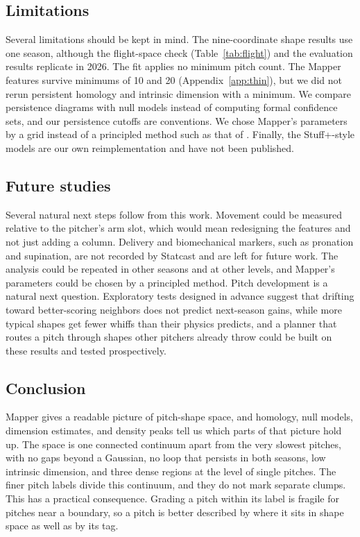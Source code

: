 \documentclass{article}
\theoremstyle{definition}
\theoremstyle{remark}
\begin{document}
\subsection{Limitations}\label{sec:limits}
Several limitations should be kept in mind.
The nine-coordinate shape results use one season, although the flight-space check (Table~\ref{tab:flight}) and the evaluation results replicate in 2026.
The fit applies no minimum pitch count. The Mapper features survive minimums of 10 and 20 (Appendix~\ref{app:thin}), but we did not rerun persistent homology and intrinsic dimension with a minimum.
We compare persistence diagrams with null models instead of computing formal confidence sets, and our persistence cutoffs are conventions.
We chose Mapper's parameters by a grid instead of a principled method such as that of \textcite{carrieremicheloudot2018}.
Finally, the Stuff+-style models are our own reimplementation and have not been published.

\subsection{Future studies}
Several natural next steps follow from this work.
Movement could be measured relative to the pitcher's arm slot, which would mean redesigning the features and not just adding a column.
Delivery and biomechanical markers, such as pronation and supination, are not recorded by Statcast and are left for future work.
The analysis could be repeated in other seasons and at other levels, and Mapper's parameters could be chosen by a principled method.
Pitch development is a natural next question. Exploratory tests designed in advance suggest that drifting toward better-scoring neighbors does not predict next-season gains, while more typical shapes get fewer whiffs than their physics predicts, and a planner that routes a pitch through shapes other pitchers already throw could be built on these results and tested prospectively.

\subsection{Conclusion}\label{sec:conclusion}
Mapper gives a readable picture of pitch-shape space, and homology, null models, dimension estimates, and density peaks tell us which parts of that picture hold up.
The space is one connected continuum apart from the very slowest pitches, with no gaps beyond a Gaussian, no loop that persists in both seasons, low intrinsic dimension, and three dense regions at the level of single pitches.
The finer pitch labels divide this continuum, and they do not mark separate clumps.
This has a practical consequence. Grading a pitch within its label is fragile for pitches near a boundary, so a pitch is better described by where it sits in shape space as well as by its tag.
\end{document}
